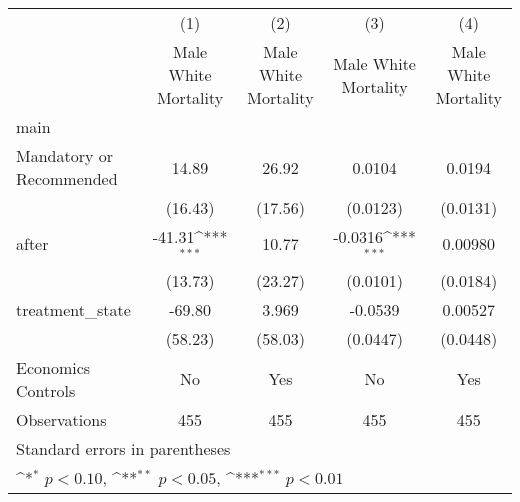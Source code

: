{
\def\sym#1{\ifmmode^{#1}\else\(^{#1}\)\fi}
\begin{longtable}{l*{4}{c}}
\hline\hline\endfirsthead\hline\endhead\hline\endfoot\endlastfoot
                    &\multicolumn{1}{c}{(1)}&\multicolumn{1}{c}{(2)}&\multicolumn{1}{c}{(3)}&\multicolumn{1}{c}{(4)}\\
                    &\multicolumn{1}{c}{Male White Mortality}&\multicolumn{1}{c}{Male White Mortality}&\multicolumn{1}{c}{Male White Mortality}&\multicolumn{1}{c}{Male White Mortality}\\
\hline
main                &                     &                     &                     &                     \\
Mandatory or Recommended&       14.89         &       26.92         &      0.0104         &      0.0194         \\
                    &     (16.43)         &     (17.56)         &    (0.0123)         &    (0.0131)         \\
[1em]
after               &      -41.31\sym{***}&       10.77         &     -0.0316\sym{***}&     0.00980         \\
                    &     (13.73)         &     (23.27)         &    (0.0101)         &    (0.0184)         \\
[1em]
treatment\_state     &      -69.80         &       3.969         &     -0.0539         &     0.00527         \\
                    &     (58.23)         &     (58.03)         &    (0.0447)         &    (0.0448)         \\
[1em]
Economics Controls  &          No         &         Yes         &          No         &         Yes         \\
\hline
Observations        &         455         &         455         &         455         &         455         \\
\hline\hline
\multicolumn{5}{l}{\footnotesize Standard errors in parentheses}\\
\multicolumn{5}{l}{\footnotesize \sym{*} \(p<0.10\), \sym{**} \(p<0.05\), \sym{***} \(p<0.01\)}\\
\end{longtable}
}
